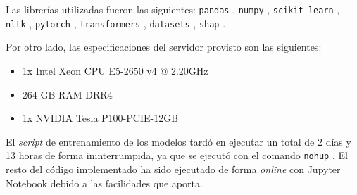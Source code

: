 Las librerías utilizadas fueron las siguientes: \texttt{pandas} \citep{pandas}, \texttt{numpy} \citep{numpy}, \texttt{scikit-learn} \citep{scikit}, \texttt{nltk} \citep{nltk}, \texttt{pytorch} \citep{pytorch}, \texttt{transformers} \citep{transformers}, \texttt{datasets} \citep{datasets}, \texttt{shap} \citep{SHAP}.

Por otro lado, las especificaciones del servidor provisto son las siguientes:
\begin{itemize}
    \item 1x Intel\textsuperscript{\textregistered}  Xeon\textsuperscript{\textregistered} CPU E5-2650 v4 @ 2.20GHz
    \item 264 GB RAM DRR4
    \item 1x NVIDIA\textsuperscript{\textregistered}  Tesla\textsuperscript{\textregistered} P100-PCIE-12GB
\end{itemize}

El \emph{script} de entrenamiento de los modelos tardó en ejecutar un total de 2 días y 13 horas de forma ininterrumpida, ya que se ejecutó con el comando \texttt{nohup} \citep{coreutils}. El resto del código implementado ha sido ejecutado de forma \emph{online} con Jupyter Notebook debido a las facilidades que aporta.
